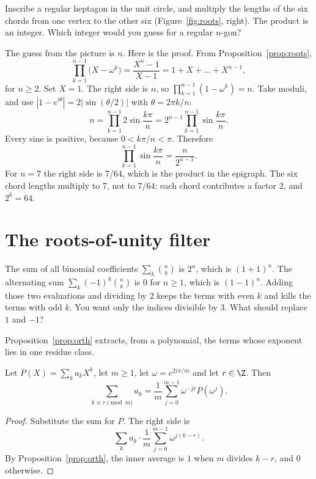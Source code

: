 \begin{think}
Inscribe a regular heptagon in the unit circle, and multiply the lengths of the six chords from one vertex to the other six (Figure~\ref{fig:roots}, right). The product is an integer. Which integer would you guess for a regular $n$-gon?
\end{think}

\begin{examplex}
The guess from the picture is $n$. Here is the proof. From Proposition~\ref{prop:roots},
\[
\prod_{k=1}^{n-1}\bigl(X-\omega^k\bigr)=\frac{X^n-1}{X-1}=1+X+\dots+X^{n-1},
\]
for $n\ge2$. Set $X=1$. The right side is $n$, so $\prod_{k=1}^{n-1}(1-\omega^k)=n$. Take moduli, and use $|1-e^{i\theta}|=2\bigl|\sin(\theta/2)\bigr|$ with $\theta=2\pi k/n$:
\[
n=\prod_{k=1}^{n-1}2\sin\frac{k\pi}n=2^{n-1}\prod_{k=1}^{n-1}\sin\frac{k\pi}n.
\]
Every sine is positive, because $0<k\pi/n<\pi$. Therefore
\[
\prod_{k=1}^{n-1}\sin\frac{k\pi}n=\frac n{2^{n-1}}.
\]
For $n=7$ the right side is $7/64$, which is the product in the epigraph. The six chord lengths multiply to $7$, not to $7/64$: each chord contributes a factor $2$, and $2^6=64$.
\end{examplex}

\section{The roots-of-unity filter}

\begin{think}
The sum of all binomial coefficients $\sum_k\binom nk$ is $2^n$, which is $(1+1)^n$. The alternating sum $\sum_k(-1)^k\binom nk$ is $0$ for $n\ge1$, which is $(1-1)^n$. Adding those two evaluations and dividing by $2$ keeps the terms with even $k$ and kills the terms with odd $k$. You want only the indices divisible by $3$. What should replace $1$ and $-1$?
\end{think}

Proposition~\ref{prop:orth} extracts, from a polynomial, the terms whose exponent lies in one residue class.

\begin{theorem}\label{thm:filter}
Let $P(X)=\sum_k a_kX^k$, let $m\ge1$, let $\omega=e^{2i\pi/m}$ and let $r\in\Z$. Then
\[
\sum_{k\equiv r\pmod m}a_k=\frac1m\sum_{j=0}^{m-1}\omega^{-jr}P(\omega^j).
\]
\end{theorem}
\begin{proof}
Substitute the sum for $P$. The right side is
\[
\sum_k a_k\cdot\frac1m\sum_{j=0}^{m-1}\omega^{j(k-r)}.
\]
By Proposition~\ref{prop:orth}, the inner average is $1$ when $m$ divides $k-r$, and $0$ otherwise.
\end{proof}

